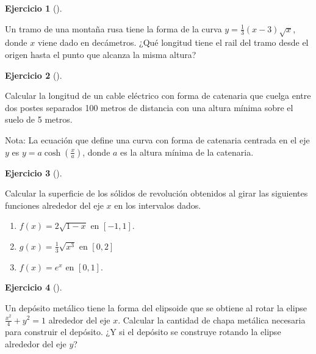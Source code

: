 \documentclass[
  a4paper,
]{scrreport}
\theoremstyle{definition}
\newtheorem{exercise}{Ejercicio}[chapter]
\theoremstyle{remark}
\begin{document}
\begin{exercise}[]\protect\hypertarget{exr-longitud-montaña-rusa}{}\label{exr-longitud-montaña-rusa}

Un tramo de una montaña rusa tiene la forma de la curva
\(y=\frac{1}{3}(x-3)\sqrt{x}\), donde \(x\) viene dado en decámetros.
¿Qué longitud tiene el rail del tramo desde el origen hasta el punto que
alcanza la misma altura?

\end{exercise}

\begin{exercise}[]\protect\hypertarget{exr-longitud-catenaria}{}\label{exr-longitud-catenaria}

Calcular la longitud de un cable eléctrico con forma de catenaria que
cuelga entre dos postes separados 100 metros de distancia con una altura
mínima sobre el suelo de 5 metros.

Nota: La ecuación que define una curva con forma de catenaria centrada
en el eje \(y\) es \(y=a\cosh\left(\frac{x}{a}\right)\), donde \(a\) es
la altura mínima de la catenaria.

\end{exercise}

\begin{exercise}[]\protect\hypertarget{exr-superficie-solido-revolucion}{}\label{exr-superficie-solido-revolucion}

Calcular la superficie de los sólidos de revolución obtenidos al girar
las siguientes funciones alrededor del eje \(x\) en los intervalos
dados.

\begin{enumerate}
\def\labelenumi{\alph{enumi}.}
\item
  \(f(x)=2\sqrt{1-x}\) en \([-1,1]\).
\item
  \(g(x)=\frac{1}{3}\sqrt{x^3}\) en \([0,2]\)
\item
  \(f(x)=e^x\) en \([0,1]\).
\end{enumerate}

\end{exercise}

\begin{exercise}[]\protect\hypertarget{exr-superficie-deposito}{}\label{exr-superficie-deposito}

Un depósito metálico tiene la forma del elipsoide que se obtiene al
rotar la elipse \(\frac{x^2}{4}+y^2=1\) alrededor del eje \(x\).
Calcular la cantidad de chapa metálica necesaria para construir el
depósito. ¿Y si el depósito se construye rotando la elipse alrededor del
eje \(y\)?

\end{exercise}
\end{document}
